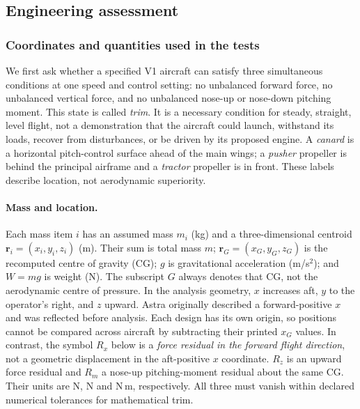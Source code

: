 \documentclass[10pt,letterpaper]{article}
\begin{document}
\subsection{Engineering assessment}
\subsubsection{Coordinates and quantities used in the tests}
We first ask whether a specified V1 aircraft can satisfy three simultaneous conditions at one speed and control setting: no unbalanced forward force, no unbalanced vertical force, and no unbalanced nose-up or nose-down pitching moment. This state is called \emph{trim}. It is a necessary condition for steady, straight, level flight, not a demonstration that the aircraft could launch, withstand its loads, recover from disturbances, or be driven by its proposed engine. A \emph{canard} is a horizontal pitch-control surface ahead of the main wings; a \emph{pusher} propeller is behind the principal airframe and a \emph{tractor} propeller is in front. These labels describe location, not aerodynamic superiority.

\paragraph{Mass and location.} Each mass item $i$ has an assumed mass $m_i$ (kg) and a three-dimensional centroid $\boldsymbol r_i=(x_i,y_i,z_i)$ (m). Their sum is total mass $m$; $\boldsymbol r_G=(x_G,y_G,z_G)$ is the recomputed centre of gravity (CG); $g$ is gravitational acceleration (m/s$^2$); and $W=mg$ is weight (N). The subscript $G$ always denotes that CG, not the aerodynamic centre of pressure. In the analysis geometry, $x$ increases aft, $y$ to the operator's right, and $z$ upward. Astra originally described a forward-positive $x$ and was reflected before analysis. Each design has its own origin, so positions cannot be compared across aircraft by subtracting their printed $x_G$ values. In contrast, the symbol $R_x$ below is a \emph{force residual in the forward flight direction}, not a geometric displacement in the aft-positive $x$ coordinate. $R_z$ is an upward force residual and $R_m$ a nose-up pitching-moment residual about the same CG. Their units are N, N and N\,m, respectively. All three must vanish within declared numerical tolerances for mathematical trim.
\end{document}
